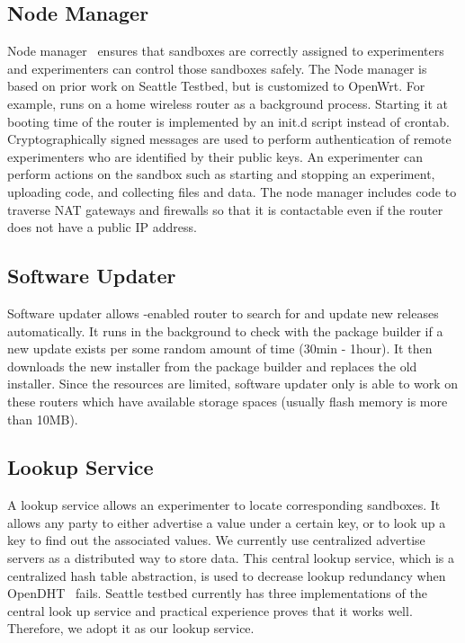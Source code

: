 \subsection{Node Manager}
\label{sec.nodemanager}
Node manager~\cite{nodemanager} ensures that sandboxes are correctly assigned to experimenters and experimenters can control those sandboxes safely. The Node manager is based on prior work on Seattle Testbed, but is customized to OpenWrt. For example, \sysname runs on a home wireless router as a background process. Starting it at booting time of the router is implemented by an init.d script instead of crontab. Cryptographically signed messages are used to perform authentication of remote experimenters who are identified by their public keys. An experimenter can perform actions on the sandbox such as starting and stopping an experiment, uploading code, and collecting files and data. The node manager includes code to traverse NAT gateways and firewalls so that it is contactable even if the router does not have a public IP address. 

\subsection{Software Updater}
\label{sec.softwareupdater}
Software updater allows \sysname-enabled router to search for and update new releases automatically. It runs in the background to check with the package builder if a new update exists per some random amount of time (30min - 1hour). It then downloads the new installer from the package builder and replaces the old installer. Since the resources are limited, software updater only is able to work on these routers which have available storage spaces (usually flash memory is more than 10MB).  

\subsection{Lookup Service}
\label{sec.lookupservice}
A lookup service allows an experimenter to locate corresponding sandboxes. It allows any party to either advertise a value under a certain key, or to look up a key to find out the associated values. We currently use centralized advertise servers as a distributed way to store data. This central lookup service, which is a centralized hash table abstraction, is used to decrease lookup redundancy when OpenDHT~\cite{rhea2005opendht} fails. Seattle testbed currently has three implementations of the central look up service and practical experience proves that it works well. Therefore, we adopt it as our lookup service.

